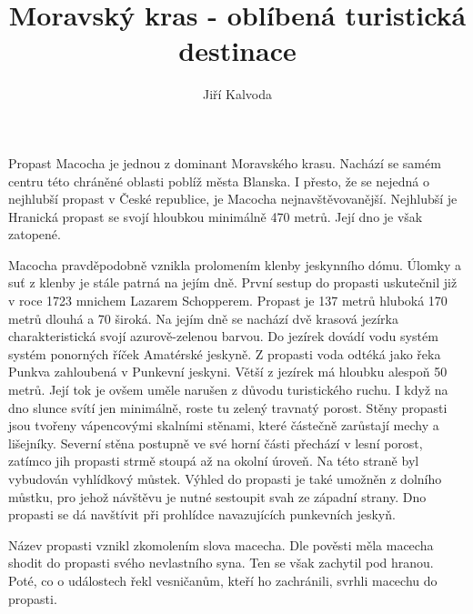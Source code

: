 \documentclass{article}
\author{Jiří Kalvoda}
\date{}
\title{Moravský kras - oblíbená turistická destinace}
\begin{document}
\maketitle
Propast Macocha je jednou z dominant Moravského krasu.
Nachází se samém centru této chráněné oblasti poblíž města Blanska.
I přesto, že se nejedná o nejhlubší propast v České republice, je Macocha nejnavštěvovanější.
Nejhlubší je Hranická propast se svojí hloubkou minimálně 470 metrů.
Její dno je však zatopené.

Macocha pravděpodobně vznikla prolomením klenby jeskynního dómu.
Úlomky a suť z klenby je stále patrná na jejím dně.
První sestup do propasti uskutečnil již v roce 1723 mnichem Lazarem Schopperem.
Propast je 137 metrů hluboká 170 metrů dlouhá a 70 široká.
Na jejím dně se nachází dvě krasová jezírka charakteristická svojí azurově-zelenou barvou.
Do jezírek dovádí vodu systém systém ponorných říček Amatérské jeskyně.
Z propasti voda odtéká jako řeka Punkva zahloubená v Punkevní jeskyni.
Větší z jezírek má hloubku alespoň 50 metrů.
Její tok je ovšem uměle narušen z důvodu turistického ruchu.
I když na dno slunce svítí jen minimálně, roste tu zelený travnatý porost.
Stěny propasti jsou tvořeny vápencovými skalními stěnami, které částečně zarůstají mechy a lišejníky.
Severní stěna postupně ve své horní části přechází v lesní porost, zatímco jih propasti strmě stoupá až na okolní úroveň.
Na této straně byl vybudován vyhlídkový můstek.
Výhled do propasti je také umožněn z dolního můstku, pro jehož návštěvu je nutné sestoupit svah ze západní strany.
Dno propasti se dá navštívit při prohlídce navazujících punkevních jeskyň.


Název propasti vznikl zkomolením slova macecha. Dle pověsti měla macecha shodit do propasti svého nevlastního syna.
Ten se však zachytil pod hranou. Poté, co o událostech řekl vesničanům, kteří ho zachránili, svrhli macechu do propasti.
\end{document}
